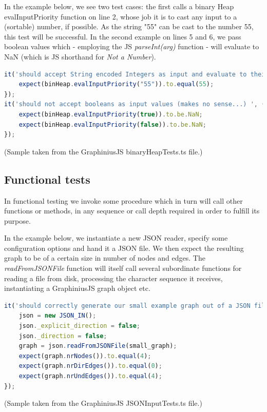 	In the example below, we see two test cases: the first calls a binary Heap evalInputPriority function on line 2, whose job it is to cast any input to a (sortable) number, if possible. As the string "55" can be cast to the number 55, this test will be successful. In the second example on lines 5 and 6, we pass boolean values which - employing the JS \textit{parseInt(arg)} function - will evaluate to NaN (which is JS shorthand for \textit{Not a Number}).
	
	\begin{lstlisting}[caption={Unit tests covering the functionality of one simple function.}, label={fig:unit_tests}, language=JavaScript]	
it('should accept String encoded Integers as input and evaluate to their Integer value', () => {
	expect(binHeap.evalInputPriority("55")).to.equal(55);
});
it('should not accept booleans as input values (makes no sense...) ', () => {
	expect(binHeap.evalInputPriority(true)).to.be.NaN;
	expect(binHeap.evalInputPriority(false)).to.be.NaN;
});
	\end{lstlisting}
	\small
	(Sample taken from the GraphiniusJS binaryHeapTests.ts file.)
	
	
	\subsection{Functional tests}
	\label{ssect:func_tests}
	
	In functional testing we invoke some procedure which in turn will call other functions or methods, in any sequence or call depth required in order to fulfill its purpose.
	
	In the example below, we instantiate a new JSON reader, specify some configuration options and hand it a JSON file. We then expect the resulting graph to be of a certain size in number of nodes and edges. The \textit{readFromJSONFile} function will itself call several subordinate functions for reading a file from disk, processing the character sequence it receives, instantiating a GraphiniusJS graph object etc.
	
	\begin{lstlisting}[caption={A functional test covering the whole instantiation process of a graph from a JSON input structure.}, label={fig:functional_test}, language=JavaScript]
it('should correctly generate our small example graph out of a JSON file with direction _mode set to undirected', () => {
	json = new JSON_IN();
	json._explicit_direction = false;
	json._direction = false;
	graph = json.readFromJSONFile(small_graph);
	expect(graph.nrNodes()).to.equal(4);
	expect(graph.nrDirEdges()).to.equal(0);
	expect(graph.nrUndEdges()).to.equal(4);
});
	\end{lstlisting}
	\small
	(Sample taken from the GraphiniusJS JSONInputTests.ts file.)
	
